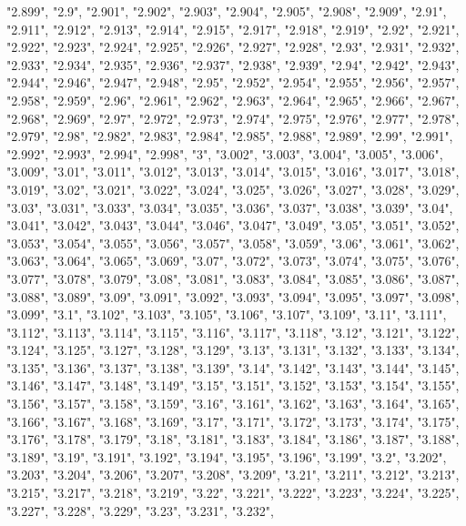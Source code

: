 \documentclass[]{article}
\begin{document}
\begin{itemize}
  "2.899", "2.9", "2.901", "2.902", "2.903", "2.904", "2.905", "2.908",
  "2.909", "2.91", "2.911", "2.912", "2.913", "2.914", "2.915", "2.917",
  "2.918", "2.919", "2.92", "2.921", "2.922", "2.923", "2.924", "2.925",
  "2.926", "2.927", "2.928", "2.93", "2.931", "2.932", "2.933", "2.934",
  "2.935", "2.936", "2.937", "2.938", "2.939", "2.94", "2.942", "2.943",
  "2.944", "2.946", "2.947", "2.948", "2.95", "2.952", "2.954", "2.955",
  "2.956", "2.957", "2.958", "2.959", "2.96", "2.961", "2.962", "2.963",
  "2.964", "2.965", "2.966", "2.967", "2.968", "2.969", "2.97", "2.972",
  "2.973", "2.974", "2.975", "2.976", "2.977", "2.978", "2.979", "2.98",
  "2.982", "2.983", "2.984", "2.985", "2.988", "2.989", "2.99", "2.991",
  "2.992", "2.993", "2.994", "2.998", "3", "3.002", "3.003", "3.004",
  "3.005", "3.006", "3.009", "3.01", "3.011", "3.012", "3.013", "3.014",
  "3.015", "3.016", "3.017", "3.018", "3.019", "3.02", "3.021", "3.022",
  "3.024", "3.025", "3.026", "3.027", "3.028", "3.029", "3.03", "3.031",
  "3.033", "3.034", "3.035", "3.036", "3.037", "3.038", "3.039", "3.04",
  "3.041", "3.042", "3.043", "3.044", "3.046", "3.047", "3.049", "3.05",
  "3.051", "3.052", "3.053", "3.054", "3.055", "3.056", "3.057",
  "3.058", "3.059", "3.06", "3.061", "3.062", "3.063", "3.064", "3.065",
  "3.069", "3.07", "3.072", "3.073", "3.074", "3.075", "3.076", "3.077",
  "3.078", "3.079", "3.08", "3.081", "3.083", "3.084", "3.085", "3.086",
  "3.087", "3.088", "3.089", "3.09", "3.091", "3.092", "3.093", "3.094",
  "3.095", "3.097", "3.098", "3.099", "3.1", "3.102", "3.103", "3.105",
  "3.106", "3.107", "3.109", "3.11", "3.111", "3.112", "3.113", "3.114",
  "3.115", "3.116", "3.117", "3.118", "3.12", "3.121", "3.122", "3.124",
  "3.125", "3.127", "3.128", "3.129", "3.13", "3.131", "3.132", "3.133",
  "3.134", "3.135", "3.136", "3.137", "3.138", "3.139", "3.14", "3.142",
  "3.143", "3.144", "3.145", "3.146", "3.147", "3.148", "3.149", "3.15",
  "3.151", "3.152", "3.153", "3.154", "3.155", "3.156", "3.157",
  "3.158", "3.159", "3.16", "3.161", "3.162", "3.163", "3.164", "3.165",
  "3.166", "3.167", "3.168", "3.169", "3.17", "3.171", "3.172", "3.173",
  "3.174", "3.175", "3.176", "3.178", "3.179", "3.18", "3.181", "3.183",
  "3.184", "3.186", "3.187", "3.188", "3.189", "3.19", "3.191", "3.192",
  "3.194", "3.195", "3.196", "3.199", "3.2", "3.202", "3.203", "3.204",
  "3.206", "3.207", "3.208", "3.209", "3.21", "3.211", "3.212", "3.213",
  "3.215", "3.217", "3.218", "3.219", "3.22", "3.221", "3.222", "3.223",
  "3.224", "3.225", "3.227", "3.228", "3.229", "3.23", "3.231", "3.232",

\end{itemize}
\end{document}
